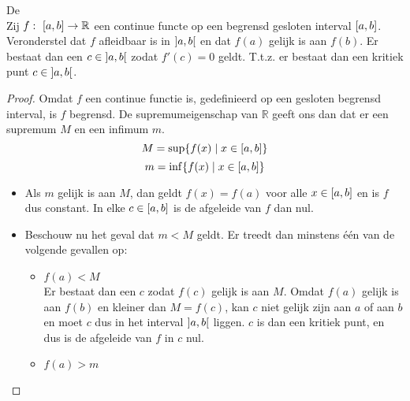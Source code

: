 \documentclass[main.tex]{subfiles}
\begin{document}
\begin{bst}
  \label{st:rolle}
  De \\
  Zij $f:\ \interval{a}{b} \rightarrow \mathbb{R}$ een continue functe op een begrensd gesloten interval $\interval{a}{b}$.
  Veronderstel dat $f$ afleidbaar is in $\interval[open]{a}{b}$ en dat $f(a)$ gelijk is aan $f(b)$.
  Er bestaat dan een $c\in \interval[open]{a}{b}$ zodat $f'(c)=0$ geldt.
  T.t.z. er bestaat dan een kritiek punt $c\in \interval[open]{a}{b}$.

  \begin{proof}
    Omdat $f$ een continue functie is, gedefinieerd op een gesloten begrensd interval, is $f$ begrensd.\needed
    De supremumeigenschap van $\mathbb{R}$ geeft ons dan dat er een supremum $M$ en een infimum $m$.
    \[ M = \sup\{f(x) \mid x \in \interval{a}{b} \} \]
    \[ m = \inf\{f(x) \mid x \in \interval{a}{b} \} \]
    \begin{itemize}
    \item
      Als $m$ gelijk is aan $M$, dan geldt $f(x)=f(a)$ voor alle $x \in \interval{a}{b}$ en is $f$ dus constant.
      In elke $c \in \interval{a}{b}$ is de afgeleide van $f$ dan nul.
    \item 
      Beschouw nu het geval dat $m< M$ geldt.
      Er treedt dan minstens \'e\'en van de volgende gevallen op:
      \begin{itemize}
      \item $f(a) < M$\\
        Er bestaat dan een $c$ zodat $f(c)$ gelijk is aan $M$.
        Omdat $f(a)$ gelijk is aan $f(b)$ en kleiner dan $M=f(c)$, kan $c$ niet gelijk zijn aan $a$ of aan $b$ en moet $c$ dus in het interval $\interval[open]{a}{b}$ liggen.
        $c$ is dan een kritiek punt, en dus is de afgeleide van $f$ in $c$ nul.
      \item $f(a) > m$\\
      \end{itemize}
    \end{itemize}
  \end{proof}
\end{bst}
\end{document}
